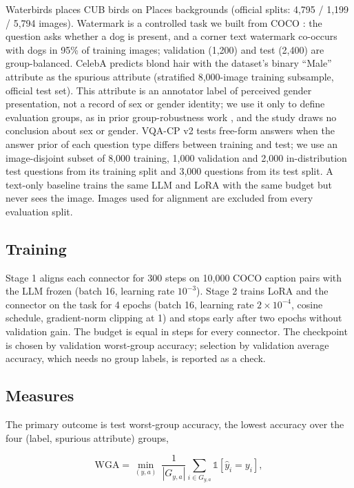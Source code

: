 Waterbirds \citep{sagawa2020groupdro} places CUB birds \citep{wah2011cub} on Places backgrounds \citep{zhou2018places} (official
splits: 4,795 / 1,199 / 5,794 images). Watermark is a controlled task we built from COCO \citep{lin2014coco}: the question
asks whether a dog is present, and a corner text watermark co-occurs with dogs in 95\% of training images; validation
(1,200) and test (2,400) are group-balanced. CelebA \citep{liu2015celeba} predicts blond hair with the dataset's binary ``Male'' attribute as the spurious attribute
(stratified 8,000-image training subsample, official test set). This attribute is an annotator label of perceived
gender presentation, not a record of sex or gender identity; we use it only to define evaluation groups, as in prior
group-robustness work \citep{sagawa2020groupdro}, and the study draws no conclusion about sex or gender. VQA-CP v2 \citep{agrawal2018vqacp} tests
free-form answers when the answer prior of each question type differs between training and test; we use an
image-disjoint subset of 8,000 training, 1,000 validation and 2,000 in-distribution test questions from its training
split and 3,000 questions from its test split. A text-only baseline trains the same LLM and LoRA with the same
budget but never sees the image. Images used for alignment are excluded from every evaluation split.

\subsection{Training}

Stage 1 aligns each connector for 300 steps on 10,000 COCO caption pairs with the LLM frozen (batch 16, learning
rate \(10^{-3}\)). Stage 2 trains LoRA and the connector on the task for 4 epochs (batch 16, learning rate
\(2 \times 10^{-4}\), cosine schedule, gradient-norm clipping at 1) and stops early after two epochs without
validation gain. The budget is equal in steps for every connector. The checkpoint is chosen by validation
worst-group accuracy; selection by validation average accuracy, which needs no group labels, is reported as a check.

\subsection{Measures}

The primary outcome is test worst-group accuracy, the lowest accuracy over the four (label, spurious attribute)
groups,

\[
\mathrm{WGA} = \min_{(y,a)} \ \frac{1}{|G_{y,a}|} \sum_{i \in G_{y,a}} \mathbb{1}[\hat y_i = y_i],
\]

